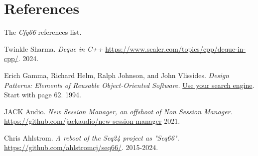 %
%
%

\section{References}
\label{sec:references}

   The \textsl{Cfg66} references list.

{\RaggedRight
\begin{thebibliography}{99}

   Twinkle Sharma.
   \emph{Deque in C++}
   \url{https://www.scaler.com/topics/cpp/deque-in-cpp/}.
   2024.

   Erich Gamma, Richard Helm, Ralph Johnson, and John Vlissides.
   \emph{Design Patterns: Elements of Reusable Object-Oriented Software.}
   \url{Use your search engine}.
   Start with page 62.
   1994.


   JACK Audio.
   \emph{New Session Manager, an offshoot of Non Session Manager.}
   \url{https://github.com/jackaudio/new-session-manager}
   2021.

   Chris Ahlstrom.
   \emph{A reboot of the Seq24 project as "Seq66".}
   \url{https://github.com/ahlstromcj/seq66/}.
   2015-2024.

\end{thebibliography}
}

